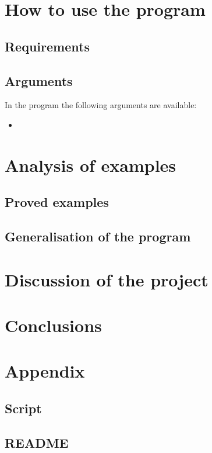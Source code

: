 \documentclass[a4paper,12pt]{report}
\begin{document}
\chapter{How to use the program}

\section{Requirements}

\section{Arguments}

In the program the following arguments are available:

\begin{itemize}
 \item 
\end{itemize}



\chapter{Analysis of examples}

\section{Proved examples}

\section{Generalisation of the program}




\chapter{Discussion of the project}


\chapter{Conclusions}



\chapter{Appendix}

\section{Script}

\section{README}
\end{document}
